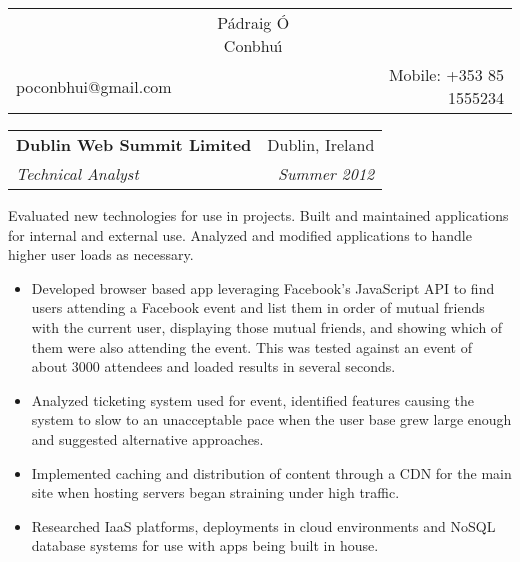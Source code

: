 \documentclass[11pt]{article}
\makeatletter
\newcommand{\resumeSection}[1]{
    \par
    \vspace{\baselineskip}
    \large {\sc {#1}}
    \par
    \vspace{-0.9\baselineskip}
    \hrulefill
    \vspace{0.5\baselineskip}
    \par
}
\newenvironment{resumeSubSectionHeader}{
    \par
    \begin{tabular*}{\textwidth}{l@{\extracolsep{\fill}}r}
    \par
} {
    \end{tabular*}
    \par
}
\newenvironment{resumeSubSectionBody}{
    \par
    \vspace{-0.8\parskip}
    \begin{small}
    \par
} {
    \par
    \end{small}
    \par
}
\makeatother
\begin{document}


%
%
\begin{center}
\begin{tabular*}{\textwidth}{@{\extracolsep{\fill}}lcr}

    &{ \huge \textbf \sc P\'{a}draig \'{O} Conbhu\'{\i} }&\\ %
    poconbhui@gmail.com &  & Mobile: +353 85 1555234\\
    \hline\hline

\end{tabular*}
\end{center}




\resumeSection{Experience}


%
%
\begin{resumeSubSectionHeader}

    \textbf{Dublin Web Summit Limited} & Dublin, Ireland \\
    \emph{Technical Analyst}           & \emph{Summer 2012}

\end{resumeSubSectionHeader}
\begin{resumeSubSectionBody}

    Evaluated new technologies for use in projects.
    Built and maintained applications for internal and external use.
    Analyzed and modified applications to handle  higher user loads
    as necessary.

    \begin{itemize}
        \item
            Developed browser based app leveraging Facebook's
            JavaScript API to find users attending a Facebook event
            and list them in order of mutual friends with the current user,
            displaying those mutual friends, and showing which of them
            were also attending the event.
            This was tested against an event of about 3000 attendees and
            loaded results in several seconds.

        \item
            Analyzed ticketing system used for event, identified features
            causing the system to slow to an unacceptable pace when the
            user base grew large enough and suggested alternative
            approaches.

        \item
            Implemented caching and distribution of content through a CDN
            for the main site when hosting servers began straining under
            high traffic.

        \item
            Researched IaaS platforms, deployments in cloud environments
            and NoSQL database systems for use with apps being built in
            house.
    \end{itemize}

\end{resumeSubSectionBody}
\end{document}
